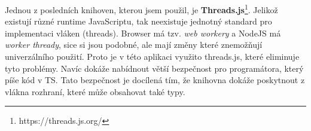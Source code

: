 Jednou z posledních knihoven, kterou jsem použil, je \textbf{Threads.js}\footnote{https://threads.js.org/}. 
Jelikož existují různé runtime JavaScriptu, tak neexistuje jednotný standard pro implementaci vláken (threads).
Browser má tzv. \textit{web workery} a NodeJS má \textit{worker thready}, sice si jsou podobné, ale mají změny které znemožňují univerzálního použití.
Proto je v této aplikaci využito threads.js, které eliminuje tyto problémy.
Navíc dokáže nabídnout větší bezpečnost pro programátora, který píše kód v TS. 
Tato bezpečnost je docílená tím, že knihovna dokáže poskytnout z vlákna rozhraní, které může obsahovat také typy.

\endinput